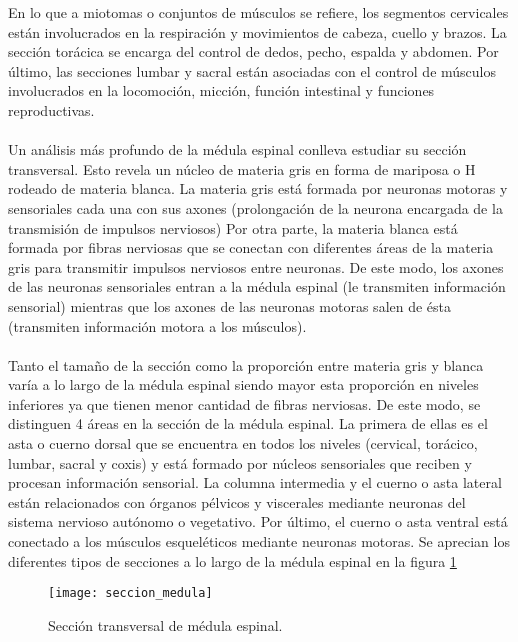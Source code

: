 En lo que a miotomas o conjuntos de músculos se refiere, los segmentos cervicales están involucrados en la respiración y movimientos de cabeza, cuello y brazos. La sección torácica se encarga del control de dedos, pecho, espalda y abdomen. Por último, las secciones lumbar y sacral están asociadas con el control de músculos involucrados en la locomoción, micción, función intestinal y funciones reproductivas. 
\\
\\
Un análisis más profundo de la médula espinal conlleva estudiar su sección transversal. Esto revela un núcleo de materia gris en forma de mariposa o H rodeado de materia blanca. La materia gris está formada por neuronas motoras y sensoriales cada una con sus axones (prolongación de la neurona encargada de la transmisión de impulsos nerviosos) Por otra parte, la materia blanca está formada por fibras nerviosas que se conectan con diferentes áreas de la materia gris para transmitir impulsos nerviosos entre neuronas. De este modo, los axones de las neuronas sensoriales entran a la médula espinal (le transmiten información sensorial) mientras que los axones de las neuronas motoras salen de ésta (transmiten información motora a los músculos)\cite{sci_clasificacion}\cite{anatomia_medula_1}.
\\
\\
Tanto el tamaño de la sección como la proporción entre materia gris y blanca varía a lo largo de la médula espinal siendo mayor esta proporción en niveles inferiores ya que tienen menor cantidad de fibras nerviosas. De este modo, se distinguen 4 áreas en la sección de la médula espinal\cite{anatomia_medula_1}\cite{anatomia_medula_2}. La primera de ellas es el asta o cuerno dorsal que se encuentra en todos los niveles (cervical, torácico, lumbar, sacral y coxis) y está formado por núcleos sensoriales que reciben y procesan información sensorial. La columna intermedia y el cuerno o asta lateral están relacionados con órganos pélvicos y viscerales mediante neuronas del sistema nervioso autónomo o vegetativo. Por último, el cuerno o asta ventral está conectado a los músculos esqueléticos mediante neuronas motoras. Se aprecian los diferentes tipos de secciones a lo largo de la médula espinal en la figura \ref{fig:seccion_medula}\\

\begin{figure}[!htb]
\centering
\texttt{[image: seccion\_medula]}
  \caption{Sección transversal de médula espinal\cite{seccion_medula}.}\label{fig:seccion_medula}
\end{figure}


